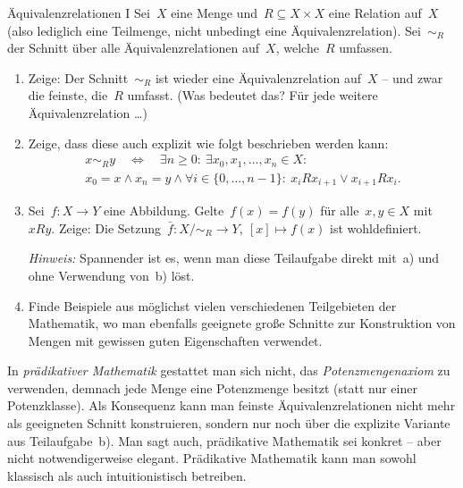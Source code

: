 \documentclass{uebblatt}
\begin{document}

\begin{aufgabe}{Äquivalenzrelationen I}
Sei~$X$ eine Menge und~$R \subseteq X \times X$ eine Relation auf~$X$
(also lediglich eine Teilmenge, nicht unbedingt eine Äquivalenzrelation).
Sei~$\sim_R$ der Schnitt über alle Äquivalenzrelationen auf~$X$, welche~$R$
umfassen.
\begin{enumerate}
\item Zeige: Der Schnitt~$\sim_R$ ist wieder eine Äquivalenzrelation auf~$X$
-- und zwar die feinste, die~$R$ umfasst. (Was bedeutet das? Für jede weitere
Äquivalenzrelation \ldots)

\item Zeige, dass diese auch explizit wie folgt beschrieben
werden kann:
\begin{multline*}
  x \sim_R y \quad\Longleftrightarrow\quad
  \exists n \geq 0{:}\
  \exists x_0,x_1,\ldots,x_n \in X{:} \\
  x_0 = x \wedge x_n = y \wedge
  \forall i \in \{ 0 , \ldots, n-1 \}{:}\
  x_i R x_{i+1} \vee x_{i+1} R x_i.
\end{multline*}

\item Sei~$f : X \to Y$ eine Abbildung. Gelte~$f(x) = f(y)$ für alle~$x,y \in
X$ mit~$xRy$. Zeige: Die Setzung~$\bar f : X/{\sim_R} \to Y,\ [x] \mapsto f(x)$
ist wohldefiniert.

\emph{Hinweis:} Spannender ist es, wenn man diese Teilaufgabe direkt mit~a) und
ohne Verwendung von~b) löst.

\item Finde Beispiele aus möglichst vielen verschiedenen Teilgebieten der
Mathematik, wo man ebenfalls geeignete große Schnitte zur Konstruktion von Mengen
mit gewissen guten Eigenschaften verwendet.
\end{enumerate}

In \emph{prädikativer Mathematik} gestattet man sich nicht, das
\emph{Potenzmengenaxiom} zu verwenden, demnach jede Menge eine Potenzmenge
besitzt (statt nur einer Potenzklasse). Als Konsequenz kann man feinste
Äquivalenzrelationen nicht mehr als geeigneten Schnitt konstruieren, sondern
nur noch über die explizite Variante aus Teilaufgabe~b). Man sagt auch,
prädikative Mathematik sei konkret -- aber nicht notwendigerweise elegant.
Prädikative Mathematik kann man sowohl klassisch als auch intuitionistisch
betreiben.
\end{aufgabe}
\end{document}
